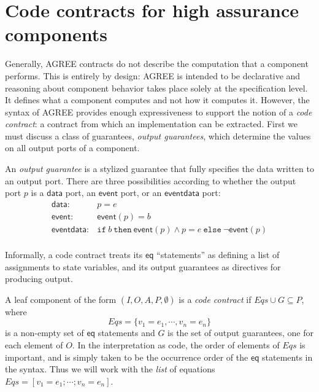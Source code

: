 \documentclass[global,twocolumn]{svjour}
\newcommand{\konst}[1]{\ensuremath{\mathsf{#1}}}
\newcommand{\set}[1]{\ensuremath{\{ {#1} \}}}
\newcommand{\itelse}[3]{\mbox{$\mathtt{if}\ {#1}\ \mathtt{then}\ {#2}\ \mathtt{else}\ {#3}$}}
\begin{document}
\section{Code contracts for high assurance components}
\label{sec:code-contracts}

Generally, AGREE contracts do not describe the computation that a component performs.
%
This is entirely by design: AGREE is intended to be declarative and reasoning about component behavior takes place solely at the specification level.
%
It defines what a component computes and not how it computes it.
%
However, the syntax of AGREE provides enough expressiveness to support the notion of a \emph{code contract}: a contract from which an implementation can be extracted.
%
First we must discuss a class of guarantees, \emph{output guarantees}, which determine the values on all output ports of a component.

\begin{definition}
An \emph{output guarantee} is a stylized guarantee that fully specifies the data written to an output port.
%
There are three possibilities according to whether the output port $p$ is a \konst{data} port, an \konst{event} port, or an \konst{event data} port:
%
\[
\begin{array}{ll}
\konst{data}: &  p = \mathit{e} \\
\konst{event}: &  \konst{event} (p) = \mathit{b} \\
\konst{event data}: & \itelse{b}{\konst{event} (p) \land p = e}{\neg \konst{event}(p)} \\
\end{array}
\]
%
\end{definition}

Informally, a code contract treats its \konst{eq} ``statements'' as defining a list of assignments to state variables, and its output guarantees as directives for producing output.

\begin{definition}
A leaf component of the form $(I,O,A,P,\emptyset)$ is a \emph{code contract} if $\mathit{Eqs} \cup G \subseteq P$, where \[\mathit{Eqs} = \set{v_1 = e_1, \cdots , v_n = e_n} \] is a non-empty set of \konst{eq} statements and $G$ is the set of output guarantees, one for each element of $O$.
%
In the interpretation as code, the order of elements of $\mathit{Eqs}$ is important, and is simply taken to be the occurrence order of the \konst{eq} statements in the syntax.
%
Thus we will work with the \emph{list} of equations $\mathit{Eqs} = [v_1 = e_1; \cdots ; v_n = e_n]$.
\end{definition}
\end{document}
